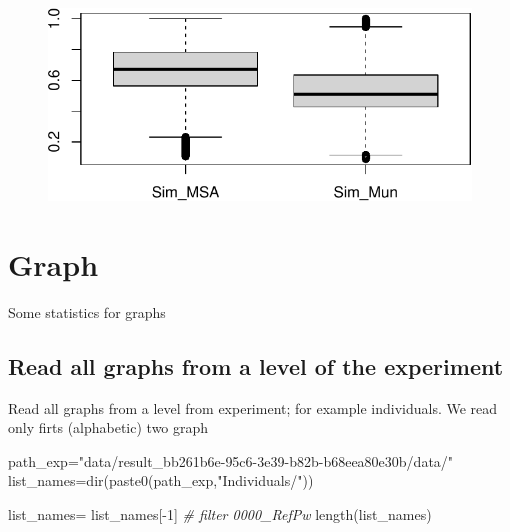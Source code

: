 \documentclass[
  letterpaper,
  DIV=11,
  numbers=noendperiod]{scrreprt}
\newenvironment{Shaded}{}{}
\newcommand{\CommentTok}[1]{\textcolor[rgb]{0.36,0.39,0.44}{\textit{#1}}}
\newcommand{\DecValTok}[1]{\textcolor[rgb]{0.82,0.60,0.40}{#1}}
\newcommand{\FunctionTok}[1]{\textcolor[rgb]{0.38,0.69,0.94}{#1}}
\newcommand{\NormalTok}[1]{\textcolor[rgb]{0.67,0.70,0.75}{#1}}
\newcommand{\OtherTok}[1]{\textcolor[rgb]{0.15,0.68,0.38}{#1}}
\newcommand{\SpecialCharTok}[1]{\textcolor[rgb]{0.34,0.71,0.76}{#1}}
\newcommand{\StringTok}[1]{\textcolor[rgb]{0.60,0.76,0.47}{#1}}
\begin{document}
\begin{figure}[H]

{\centering \includegraphics[width=1\textwidth,height=\textheight]{index_files/figure-pdf/unnamed-chunk-45-1.pdf}

}

\end{figure}


\hypertarget{graph}{%
\chapter{Graph}\label{graph}}

Some statistics for graphs

\hypertarget{read-all-graphs-from-a-level-of-the-experiment}{%
\section{Read all graphs from a level of the
experiment}\label{read-all-graphs-from-a-level-of-the-experiment}}

Read all graphs from a level from experiment; for example individuals.
We read only firts (alphabetic) two graph

\begin{Shaded}
\begin{Highlighting}[]
\NormalTok{path\_exp}\OtherTok{=}\StringTok{"data/result\_bb261b6e{-}95c6{-}3e39{-}b82b{-}b68eea80e30b/data/"}
\NormalTok{list\_names}\OtherTok{=}\FunctionTok{dir}\NormalTok{(}\FunctionTok{paste0}\NormalTok{(path\_exp,}\StringTok{"Individuals/"}\NormalTok{))}

\NormalTok{list\_names}\OtherTok{=}\NormalTok{ list\_names[}\SpecialCharTok{{-}}\DecValTok{1}\NormalTok{] }\CommentTok{\# filter 0000\_RefPw}
\FunctionTok{length}\NormalTok{(list\_names)}
\end{Highlighting}
\end{Shaded}
\end{document}

